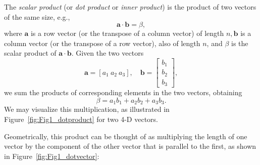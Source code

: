 The \emph{scalar product} (or \emph{dot product} or 
\emph{inner product}) is the product of two vectors of the same size, e.g.,
\begin{equation}
\mathbf{a}\cdot \mathbf{b} = \beta,
\end{equation}	 
where $\mathbf a$ is a row vector (or the transpose of a column vector) of length $n, \mathbf{b}$ is a column vector (or 
the transpose of a row vector), also of length $n$, and $\beta$ is the scalar product of $\mathbf a \cdot \mathbf b$.
Given the two vectors
\begin{equation}
\mathbf{a} = [a_1 \ a_2 \ a_3 ], \quad \mathbf{b} = \left[ \begin{array}{c}
b_1\\
b_2\\
b_3
\end{array}
\right],
\end{equation}	 
we sum the products of corresponding elements in the two vectors, obtaining
\begin{equation}
\beta = a_1 b_1 + a_2b_2 + a_3b_3.
\end{equation}
We may visualize this multiplication, as illustrated in Figure~\ref{fig:Fig1_dotproduct} for two 4-D vectors.

Geometrically, this product can be thought of as multiplying the length of one vector by the 
component of the other vector that is parallel to the first, as shown in Figure~\ref{fig:Fig1_dotvector}:


